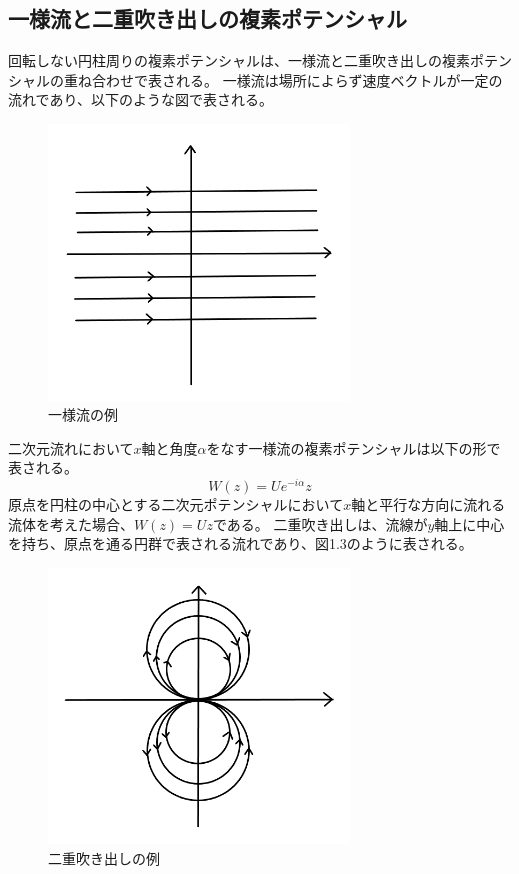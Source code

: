 \documentclass[10pt,b5paper,papersize,dvipdfmx]{jsbook}
\begin{document}
\subsection{一様流と二重吹き出しの複素ポテンシャル}
回転しない円柱周りの複素ポテンシャルは、一様流と二重吹き出しの複素ポテンシャルの重ね合わせで表される。
一様流は場所によらず速度ベクトルが一定の流れであり、以下のような図で表される。
\begin{figure}[ht]
  \centering
  \includegraphics[width=80mm]{img/ryuutai3.png}
  \caption{一様流の例}
\end{figure}
\par
二次元流れにおいて$x$軸と角度$\alpha$をなす一様流の複素ポテンシャルは以下の形で表される。
\begin{equation}
  W(z)=Ue^{-i\alpha}z
\end{equation}
原点を円柱の中心とする二次元ポテンシャルにおいて$x$軸と平行な方向に流れる流体を考えた場合、$W(z)=Uz$である。
二重吹き出しは、流線が$y$軸上に中心を持ち、原点を通る円群で表される流れであり、図1.3のように表される。
\begin{figure}[ht]
  \centering
  \includegraphics[width=80mm]{img/ryuutai2.png}
  \caption{二重吹き出しの例}
\end{figure}
\end{document}
